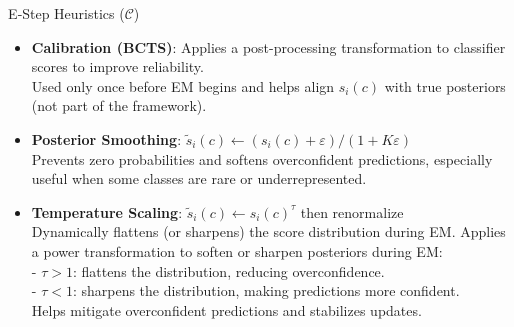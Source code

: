 \documentclass[aspectratio=169]{beamer}
\begin{document}
\begin{frame}{E‑Step Heuristics ($\mathcal{C}$)}
  \begin{itemize}
    \item \textbf{Calibration (BCTS)}: Applies a post-processing transformation to classifier scores to improve reliability.\\
    \small Used only once before EM begins and helps align $s_i(c)$ with true posteriors (not part of the framework).
    \normalsize

    \item \textbf{Posterior Smoothing}: $\tilde{s}_i(c)\! \leftarrow\! (s_i(c)+\varepsilon)/(1+K\varepsilon)$\\
    \small Prevents zero probabilities and softens overconfident predictions, especially useful when some classes are rare or underrepresented.
    \normalsize

    \item \textbf{Temperature Scaling}: $\tilde{s}_i(c) \leftarrow s_i(c)^{\tau}$ then renormalize\\
    \small Dynamically flattens (or sharpens) the score distribution during EM. 
    \small Applies a power transformation to soften or sharpen posteriors during EM:\\
    - \( \tau > 1 \): flattens the distribution, reducing overconfidence.\\
    - \( \tau < 1 \): sharpens the distribution, making predictions more confident.\\Helps mitigate overconfident predictions and stabilizes updates.
  \end{itemize}
\end{frame}
\end{document}
